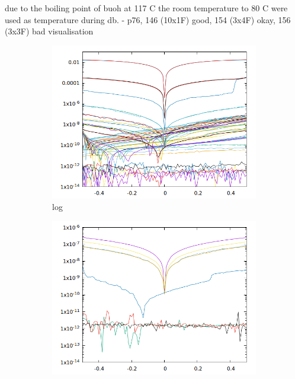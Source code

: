 due to the boiling point of \gls{buoh} at 117 C\cite{ncbi1butanol} the room temperature to 80 C were used as temperature during \gls{db}.
- p76, 146 (10x1F) good, 154 (3x4F) okay, 156 (3x3F) bad visualisation
\begin{figure}
    \centering
    \begin{subfigure}{.3\textwidth}
        \includegraphics[width=\textwidth]{Pics/iv/log-146-good-10x1F.png}
        \caption{log} \label{fig:log1}
    \end{subfigure}
    \begin{subfigure}{.3\textwidth}
        \includegraphics[width=\textwidth]{Pics/iv/log-154-okay-3x4F.png}

\end{subfigure}
\end{figure}

